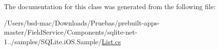 The documentation for this class was generated from the following file\+:\begin{DoxyCompactItemize}
\item 
/\+Users/bsd-\/mac/\+Downloads/\+Pruebas/prebuilt-\/apps-\/master/\+Field\+Service/\+Components/sqlite-\/net-\/1../samples/\+S\+Q\+Lite.\+i\+O\+S.\+Sample/\hyperlink{_s_q_lite_8i_o_s_8_sample_2_list_8cs}{List.\+cs}\end{DoxyCompactItemize}
